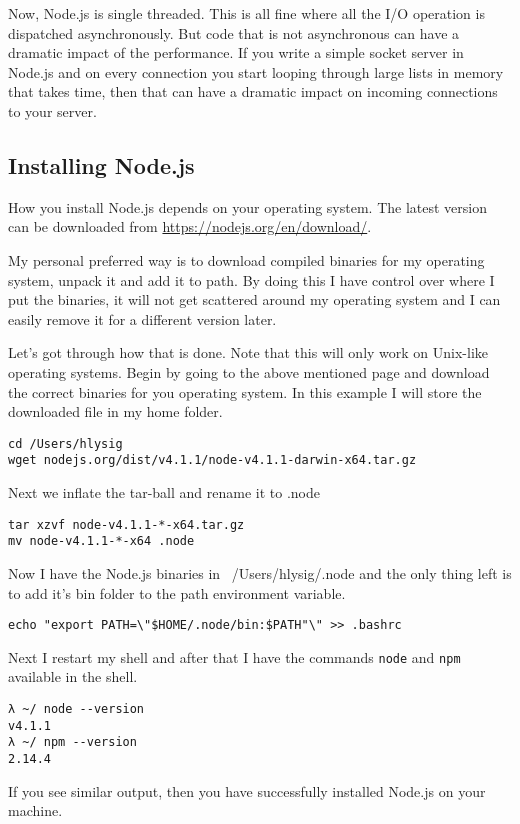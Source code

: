 Now, Node.js is single threaded. This is all fine where all the I/O operation is dispatched asynchronously. But code that is not asynchronous can have a dramatic impact of the performance. If you write a simple socket server in Node.js and on every connection you start looping through large lists in memory that takes time, then that can have a dramatic impact on incoming connections to your server.

\subsection{Installing Node.js}
How you install Node.js depends on your operating system. The latest version can be downloaded from \url{https://nodejs.org/en/download/}.

My personal preferred way is to download compiled binaries for my operating system, unpack it and add it to path. By doing this I have control over where I put the binaries, it will not get scattered around my operating system and I can easily remove it for a different version later.

Let's got through how that is done. Note that this will only work on Unix-like operating systems. Begin by going to the above mentioned page and download the correct binaries for you operating system. In this example I will store the downloaded file in my home folder.

\begin{lstlisting}
cd /Users/hlysig
wget nodejs.org/dist/v4.1.1/node-v4.1.1-darwin-x64.tar.gz
\end{lstlisting}

Next we inflate the tar-ball and rename it to .node
\begin{lstlisting}
tar xzvf node-v4.1.1-*-x64.tar.gz
mv node-v4.1.1-*-x64 .node
\end{lstlisting}

Now I have the Node.js binaries in ~/Users/hlysig/.node and the only thing left is to add it's bin folder to the path environment variable.

\begin{lstlisting}
echo "export PATH=\"$HOME/.node/bin:$PATH"\" >> .bashrc
\end{lstlisting}

Next I restart my shell and after that I have the commands \texttt{node} and \texttt{npm} available in the shell.
\begin{lstlisting}
λ ~/ node --version
v4.1.1
λ ~/ npm --version
2.14.4
\end{lstlisting}
If you see similar output, then you have successfully installed Node.js on your machine.

